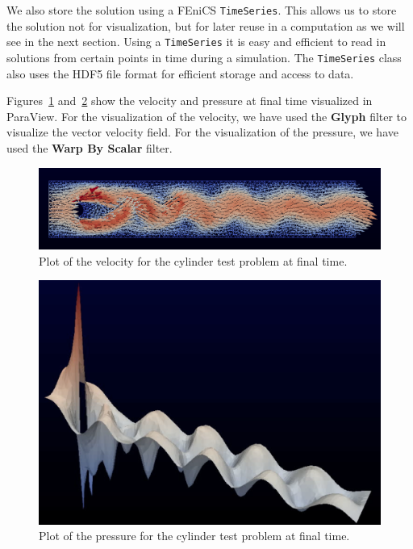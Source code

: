 \documentclass[graybox,envcountchap,sectrefs,final]{svmonodo}
\begin{document}

We also store the solution using a FEniCS \texttt{TimeSeries}. This allows us
to store the solution not for visualization, but for later reuse in a
computation as we will see in the next section. Using a \texttt{TimeSeries}
it is easy and efficient to read in solutions from certain points in
time during a simulation. The \texttt{TimeSeries} class also uses the HDF5
file format for efficient storage and access to data.

Figures~\ref{ftut1:fig:navier_stokes_cylinder:velocity} and~\ref{ftut1:fig:navier_stokes_cylinder:pressure} show the velocity and
pressure at final time visualized in ParaView. For the visualization
of the velocity, we have used the \textbf{Glyph} filter to visualize the
vector velocity field. For the visualization of the pressure, we have
used the \textbf{Warp By Scalar} filter.


\begin{figure}[!ht]  %
  \centerline{\includegraphics[width=0.95\linewidth]{fig/navier_stokes_cylinder_velocity.png}}
  \caption{
  Plot of the velocity for the cylinder test problem at final time. \label{ftut1:fig:navier_stokes_cylinder:velocity}
  }
\end{figure}



\begin{figure}[!ht]  %
  \centerline{\includegraphics[width=0.95\linewidth]{fig/navier_stokes_cylinder_pressure.png}}
  \caption{
  Plot of the pressure for the cylinder test problem at final time. \label{ftut1:fig:navier_stokes_cylinder:pressure}
  }
\end{figure}
\end{document}
